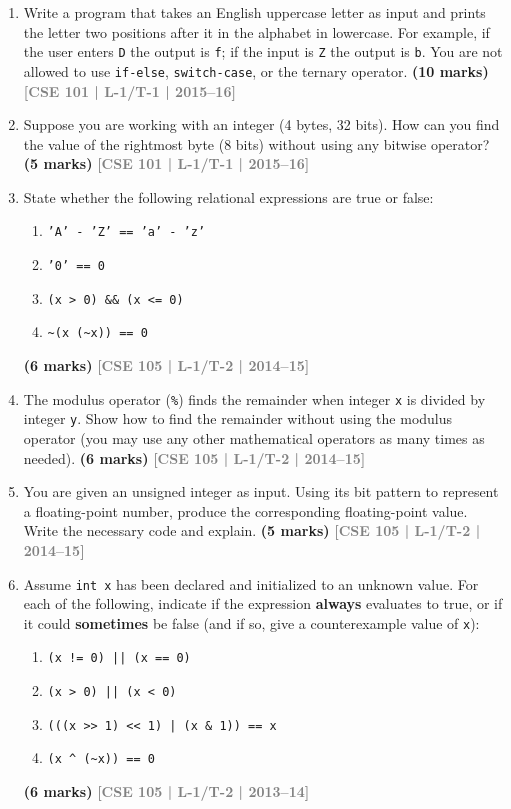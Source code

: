 \documentclass[12pt,a3paper]{article}
\newcommand{\yr}[1]{\hfill\textcolor{gray}{\small\textbf{[#1]}}}
\newcommand{\mk}[1]{\textcolor{orange!70!black}{\small\textbf{(#1 marks)}}}
\begin{document}
\begin{enumerate}
\begin{lstlisting}
int a = 2, b = 5, c;
c = a +++ b;
printf("%d, %d, %d", a, b, c);
\end{lstlisting}
\mk{5} \yr{CSE 101 | L-1/T-1 | 2015--16}

\item Write a program that takes an English uppercase letter as input and prints the letter two positions after it in the alphabet in lowercase. For example, if the user enters \texttt{D} the output is \texttt{f}; if the input is \texttt{Z} the output is \texttt{b}. You are not allowed to use \texttt{if-else}, \texttt{switch-case}, or the ternary operator.
\mk{10} \yr{CSE 101 | L-1/T-1 | 2015--16}

\item Suppose you are working with an integer (4 bytes, 32 bits). How can you find the value of the rightmost byte (8 bits) without using any bitwise operator?
\mk{5} \yr{CSE 101 | L-1/T-1 | 2015--16}

\item State whether the following relational expressions are true or false:
\begin{enumerate}
  \item \texttt{'A' - 'Z' == 'a' - 'z'}
  \item \texttt{'0' == 0}
  \item \texttt{(x > 0) \&\& (x <= 0)}
  \item \texttt{\textasciitilde(x (\textasciitilde x)) == 0}
\end{enumerate}
\mk{6} \yr{CSE 105 | L-1/T-2 | 2014--15}

\item The modulus operator (\texttt{\%}) finds the remainder when integer \texttt{x} is divided by integer \texttt{y}. Show how to find the remainder without using the modulus operator (you may use any other mathematical operators as many times as needed).
\mk{6} \yr{CSE 105 | L-1/T-2 | 2014--15}

\item You are given an unsigned integer as input. Using its bit pattern to represent a floating-point number, produce the corresponding floating-point value. Write the necessary code and explain.
\mk{5} \yr{CSE 105 | L-1/T-2 | 2014--15}

\item Assume \texttt{int x} has been declared and initialized to an unknown value. For each of the following, indicate if the expression \textbf{always} evaluates to true, or if it could \textbf{sometimes} be false (and if so, give a counterexample value of \texttt{x}):
\begin{enumerate}
  \item \texttt{(x != 0) || (x == 0)}
  \item \texttt{(x > 0) || (x < 0)}
  \item \texttt{(((x >> 1) << 1) | (x \& 1)) == x}
  \item \texttt{(x \^{} (\textasciitilde x)) == 0}
\end{enumerate}
\mk{6} \yr{CSE 105 | L-1/T-2 | 2013--14}


\end{enumerate}
\end{document}
